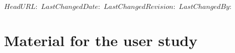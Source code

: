 \svnidlong
{$HeadURL:  $}
{$LastChangedDate:  $}
{$LastChangedRevision:  $}
{$LastChangedBy:  $}
\chapter[Material for the user study]{Material for the user study\versionfootnote}
\label{cha:appendix-userstudy}




